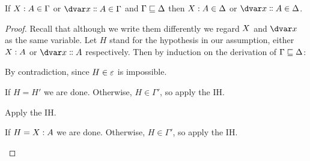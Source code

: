 \begin{lemma}\label{lemma-weakening-variables}
  If $\hm x A \in \Gamma$ or $\hd x A \in \Gamma$ and $\Gamma \sqsubseteq \Delta$
  then $\hm x A \in \Delta$ or $\hd x A \in \Delta$.
\end{lemma}
\begin{proof}
  Recall that although we write them differently we regard $\mvar x$ and $\dvar
  x$ as the same variable.
%
  Let $H$ stand for the hypothesis in our assumption, either $\hm x A$ or $\hd x
  A$ respectively. Then by induction on the derivation of $\Gamma
  \sqsubseteq \Delta$:

  \begin{description}[itemsep=1ex]
  \item[Case\, $\emptycx \weaker \emptycx$.] By contradiction, since $H \in
    \varepsilon$ is impossible.

  \item[Case\, $\infer{\Gamma' \weaker \Delta'}{\Gamma',H' \weaker
      \Delta',H'}$.] If $H = H'$ we are done. Otherwise, $H \in \Gamma'$, so
    apply the IH.

  \item[Case\, $\infer{\Gamma \weaker \Delta'}{\Gamma \weaker \Delta',H}$.]
    Apply the IH.

  \item[Case\, $\infer{\Gamma' \weaker \Delta'}{\Gamma',\,\hm x A \weaker
      \Delta',\hd x A}$.] If $H = \hm x A$ we are done. Otherwise, $H \in
    \Gamma'$, so apply the IH.
  \end{description}
\end{proof}

